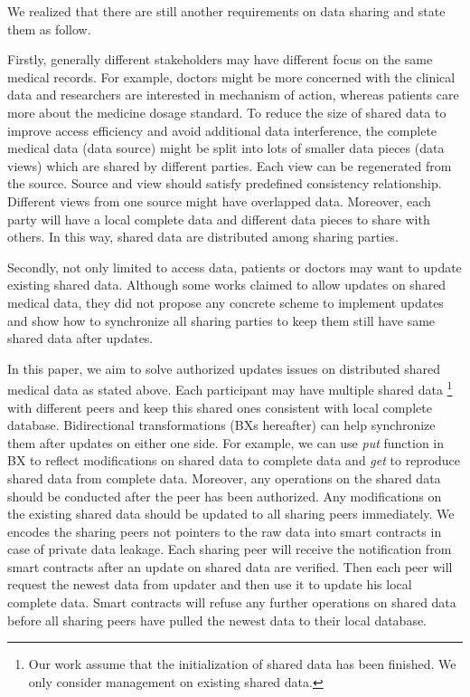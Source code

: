 \documentclass[conference]{IEEEtran}
\begin{document}
We realized that there are still another requirements on data sharing and state them as follow.

Firstly, generally different stakeholders may have different focus on the same medical records. For example, doctors might be more concerned with the clinical data and researchers are interested in mechanism of action, whereas patients care more about the medicine dosage standard. To reduce the size of shared data to improve access efficiency and avoid additional data interference, the complete medical data (data source) might be split into lots of smaller data pieces (data views) which are shared by different parties. Each view can be regenerated from the source. Source and view should satisfy predefined consistency relationship. Different views from one source might have overlapped data. Moreover, each party will have a local complete data and different data pieces to share with others. In this way, shared data are distributed among sharing parties.

Secondly, not only limited to access data, patients or doctors may want to update existing shared data. Although some works \cite{azaria2016medrec} claimed to allow updates on shared medical data, they did not propose any concrete scheme to implement updates and show how to synchronize all sharing parties to keep them still have same shared data after updates.

In this paper, we aim to solve authorized updates issues on distributed shared medical data as stated above. 
Each participant may have multiple shared data \footnote{Our work assume that the initialization of shared data has been finished. We only consider management on existing shared data.} with different peers and keep this shared ones consistent with local complete database. Bidirectional transformations \cite{hu2014validity} (BXs hereafter) can help synchronize them after updates on either one side. For example, we can use \emph{put} function in BX to reflect modifications on shared data to complete data and \emph{get} to reproduce shared data from complete data. 
Moreover,  any operations on the shared data should be conducted after the peer has been authorized. Any modifications on the existing shared data should be updated to all sharing peers immediately. We encodes the sharing peers not pointers to the raw data into smart contracts in case of private data leakage. Each sharing peer will receive the notification from smart contracts after an update on shared data are verified. Then each peer will request the newest data from updater and then use it to update his local complete data. Smart contracts will refuse any further operations on shared data before all sharing peers have pulled the newest data to their local database.
\end{document}
